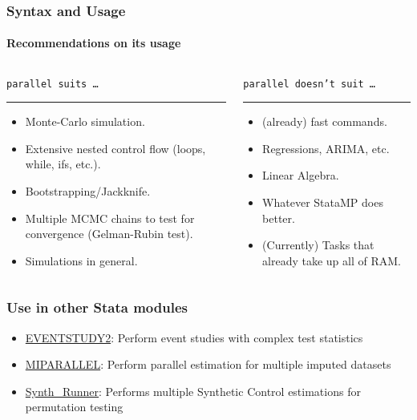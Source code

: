 \documentclass[9pt,\ExtraDocOpts]{beamer}
\begin{document}
\begin{frame}
\frametitle{Syntax and Usage}
\framesubtitle{Recommendations on its usage}

\begin{columns}
\begin{column}{.5\textwidth}
{\color{gray}
{\tt parallel suits \ldots}
\rule{\linewidth}{4pt}}
\begin{itemize}
\item Monte-Carlo simulation.\pause{}
\item Extensive nested control flow (loops, while, ifs, etc.).\pause{}
\item Bootstrapping/Jackknife.\pause{}
\item Multiple MCMC chains to test for convergence (Gelman-Rubin test).\pause{}
\item Simulations in general.\pause{}
\end{itemize}
\end{column}%
\hfill%
\begin{column}{.5\textwidth}
{\color{gray}
{\tt parallel doesn't suit \ldots}
\rule{\linewidth}{4pt}}
\begin{itemize}
\item (already) fast commands.\pause{}
\item Regressions, ARIMA, etc.\pause{}
\item Linear Algebra.\pause{}
\item Whatever StataMP does better.\pause{}
\item (Currently) Tasks that already take up all of RAM.
\end{itemize}
\end{column}%
\end{columns}
\end{frame}


\begin{frame}
\frametitle{Use in other Stata modules}

\begin{itemize}
\item \href{https://ideas.repec.org/c/boc/bocode/s458086.html}{EVENTSTUDY2}: Perform event studies with complex test statistics 
\item \href{https://ideas.repec.org/c/boc/bocode/s457822.html}{MIPARALLEL}: Perform parallel estimation for multiple imputed datasets 
\item \href{https://github.com/bquistorff/synth_runner}{Synth\_Runner}: Performs multiple Synthetic Control estimations for permutation testing 

\end{itemize}

\end{frame}
\end{document}
